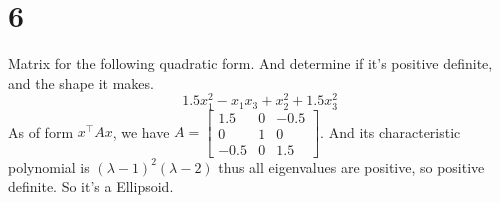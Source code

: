 \documentclass{article}
\begin{document}
\section*{6}
\begin{myleftlinebox}
    Matrix for the following quadratic form. And determine if it's positive definite, and the shape it makes.
    \[1.5 x_1^2 - x_1x_3 + x_2^2 + 1.5 x_3^2\]
    \tcblower
    As of form \(x^\top A x\), we have \(A = \begin{bmatrix}
        1.5 & 0 & -0.5 \\
        0 & 1 & 0\\
         -0.5 & 0 & 1.5
    \end{bmatrix}\). And its characteristic polynomial is \((\lambda-1)^2(\lambda-2)\) thus all eigenvalues are positive, so positive definite. So it's a Ellipsoid.
\end{myleftlinebox}
\end{document}

